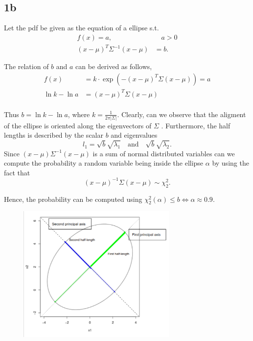 \documentclass{article}
\theoremstyle{remark}
\begin{document}
\subsection*{ 1b}%
\label{sub:1_b}


Let the pdf be given as the equation of a ellipse s.t. \[
\begin{split}
    f\left( x \right)  = a,& \quad  a>0 \\
    \left( x- \mu  \right)^{T} \Sigma ^{-1} \left( x - \mu  \right) & = b.
\end{split}
\]

The relation of $b$  and $a$ can be derived as follows,\[
    \begin{split}
f\left( x \right) & = k \cdot  \exp \left( - \left( x- \mu  \right)^{T} \Sigma \left( x - \mu  \right) \right) = a \\
\ln k - \ln a &=  \left( x- \mu  \right)^{T} \Sigma  \left( x-\mu  \right) \\
    \end{split}
\]

Thus $b = \ln k - \ln a$, where $\displaystyle k = \frac{1}{2 \pi \left| \Sigma  \right|}$. Clearly, can we observe that
the aligment of the ellipse is oriented along the eigenvectors of $\Sigma $ . Furthermore, the half lengths is described by the
scalar $b$  and eigenvalues \[
    l_{1} = \sqrt{b} \sqrt{\lambda _{1}}  \quad \text{and} \quad  \sqrt{b}  \sqrt{\lambda _{2}} .
\]
Since $\left( x- \mu  \right) \Sigma ^{-1} \left( x - \mu  \right)$ is a sum of normal distributed variables can we
compute the probability a random variable being inside the ellipse $\alpha $ by using the fact that \[
    \left( x - \mu   \right)^{-1} \Sigma  \left( x - \mu  \right) \sim  \chi _{2} ^{2}.
\]

Hence, the probability can be computed using $\chi _{2}^{2}\left( \alpha   \right) \le b \iff \alpha  \approx 0.9$.



\begin{figure}[H]
    \centering
    \includegraphics[width=0.7\textwidth]{axis.png}
    \label{oppg3}
\end{figure}
\end{document}
